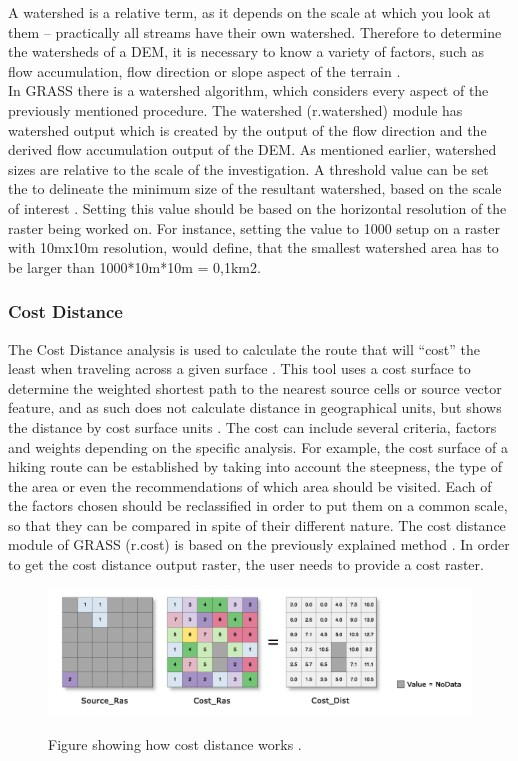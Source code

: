 A watershed is a relative term, as it depends on the scale at which you look at them – practically all streams have their own watershed. Therefore to determine the watersheds of a DEM, it is necessary to know a variety of factors, such as flow accumulation, flow direction or slope aspect of the terrain \citep{rwatershed}. \\
In  GRASS there is a watershed algorithm, which considers every aspect of the previously mentioned procedure. The watershed (r.watershed) module has watershed output which is created by the output of the flow direction and the derived flow accumulation output of the DEM. As mentioned earlier, watershed sizes are relative to the scale of the investigation. A threshold value can be set the to delineate the minimum size of the resultant watershed, based on the scale of interest \citep{grassbook} \citep{rwatershed}. Setting this value should be based on the horizontal resolution of the raster being worked on. For instance, setting the value to 1000 setup on a raster with 10mx10m resolution, would define, that the smallest watershed area has to be larger than 1000*10m*10m = 0,1km2.

\subsubsection{Cost Distance}
The Cost Distance analysis is used to calculate the route that will “cost” the least when traveling across a given surface \citep{grassbook}. This tool uses a cost surface to determine the weighted shortest path to the nearest source cells or source vector feature, and as such does not calculate distance in geographical units, but shows the distance by cost surface units \citep{rcost}. The cost can include several criteria, factors and weights depending on the specific analysis. For example, the cost surface of a hiking route can be established by taking into account the steepness, the type of the area or even the recommendations of which area should be visited.
Each of the factors chosen should be reclassified in order to put them on a common scale, so that they can be compared in spite of their different nature. 
The cost distance module of GRASS (r.cost) is based on the previously explained method \citep{rcost}. In order to get the cost distance output raster, the user needs to provide a cost raster.

\begin{figure}[t]
\centering
	{\includegraphics[width=\linewidth]{gfx/COST.png}}
\caption{Figure showing how cost distance works \citep{costdistance}.}
\end{figure}

